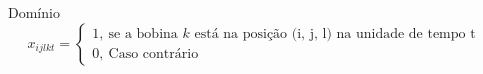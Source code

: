 \begin{frame}{Domínio}
    \[
    x_{ijlkt} =
    \left\{ 
        \begin{array}{l}
            1,\ \text{se a bobina $k$ está na posição $$(i, j, l)$$ na unidade de tempo t}&\\
            0,\ \text{Caso contrário}
        \end{array} 
    \right.
    \]
\end{frame}


